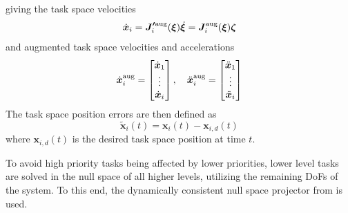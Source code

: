 \documentclass[../main.tex]{subfiles}
\begin{document}
giving the task space velocities
\begin{equation}
   \dot{\bm{x}}_i = \bm{J'}^{\rm aug}_i(\bm{\xi}) \dot{\bm{\xi}} = \bm{J}^{\rm aug}_i(\bm{\xi}) \bm{\zeta}
\end{equation}
and augmented task space velocities and accelerations
\begin{equation}
    \dot{\bm{x}}_i^{\rm aug} = \begin{bmatrix}
        \dot{\bm{x}}_1 \\
        \vdots \\
        \dot{\bm{x}}_i
    \end{bmatrix}, \quad
    \ddot{\bm{x}}_i^{\rm aug} = \begin{bmatrix}
        \ddot{\bm{x}}_1 \\
        \vdots \\
        \ddot{\bm{x}}_i
    \end{bmatrix}
\end{equation}
The task space position errors are then defined as
\begin{equation}
    \tilde{\bm{x}}_i(t) = \bm{x}_i(t) - \bm{x}_{i, d}(t)
\end{equation}
where $\bm{x}_{i,d}(t)$ is the desired task space position at time $t$.

To avoid high priority tasks being affected by lower priorities, lower level tasks are solved in the null space of all higher levels, utilizing the remaining DoFs of the system. To this end, the dynamically consistent null space projector from \cite{Khatib1987} is used.
\end{document}
